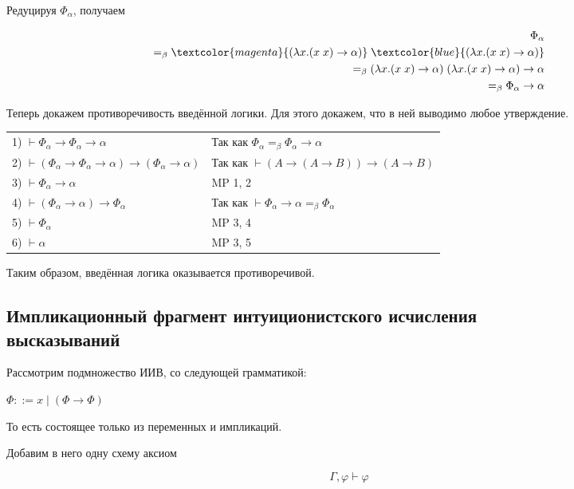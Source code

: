 Редуцируя $\Phi_{\alpha}$, получаем 

\begin{align*}
\Phi_{\alpha} \\ =_{\beta} \textcolor{magenta}{(\lambda x. (x \; x) \rightarrow \alpha)} \; \textcolor{blue}{(\lambda x. (x \; x) \rightarrow \alpha)} \\=_{\beta} (\lambda x. (x \; x) \rightarrow \alpha) \; (\lambda x. (x \; x) \rightarrow \alpha) \rightarrow \alpha \\=_{\beta} \Phi_{\alpha} \rightarrow \alpha
\end{align*}

Теперь докажем противоречивость введённой логики. Для этого докажем, что в ней выводимо любое утверждение.

\begin{tabular}{ll}
	1) $\vdash\Phi_\alpha\rightarrow\Phi_\alpha\rightarrow\alpha$ & Так как $\Phi_{\alpha} =_{\beta} \Phi_{\alpha} \rightarrow \alpha$\\
	2) $\vdash(\Phi_\alpha\rightarrow\Phi_\alpha\rightarrow\alpha)\rightarrow(\Phi_\alpha\rightarrow\alpha)$ & Так как $\vdash (A \rightarrow (A \rightarrow B)) \rightarrow (A \rightarrow B)$\\
	3) $\vdash\Phi_\alpha\rightarrow\alpha$ & MP 1, 2\\
	4) $\vdash (\Phi_\alpha \rightarrow \alpha) \rightarrow \Phi_\alpha$ & Так как $\vdash \Phi_\alpha \rightarrow \alpha =_{\beta} \Phi_\alpha$\\
	5) $\vdash\Phi_\alpha$ & MP 3, 4\\
	6) $\vdash\alpha$ & MP 3, 5
\end{tabular}

Таким образом, введённая логика оказывается противоречивой.

\subsection{Импликационный фрагмент интуиционистского исчисления \\высказываний}

Рассмотрим подмножество ИИВ, со следующей грамматикой:

$\Phi ::= x \; | \; \left(\Phi \rightarrow \Phi\right) \;$

То есть состоящее только из переменных и импликаций. 

Добавим в него одну схему аксиом

$$\Gamma, \varphi \vdash \varphi$$


